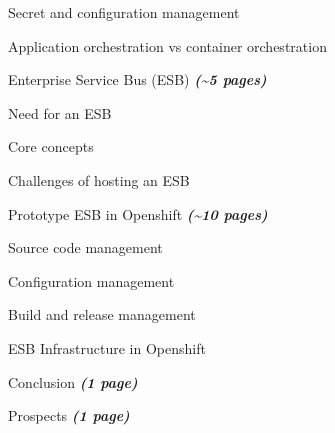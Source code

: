 \begin{numbered}
\begin{numbered}
		\item Secret and configuration management
		\item Application orchestration vs container orchestration
	\end{numbered}
	\item Enterprise Service Bus (ESB) \textbf{\textit{(\textasciitilde 5 pages)}}
	\begin{numbered}
		\item Need for an ESB
		\item Core concepts
		\item Challenges of hosting an ESB 
	\end{numbered}
	\item Prototype ESB in Openshift \textbf{\textit{(\textasciitilde 10 pages)}}
	\begin{numbered}
		\item Source code management
		\item Configuration management
		\item Build and release management
		\item ESB Infrastructure in Openshift
	\end{numbered}	
	\item Conclusion \textbf{\textit{(1 page)}}
	\item Prospects \textbf{\textit{(1 page)}}
\end{numbered}